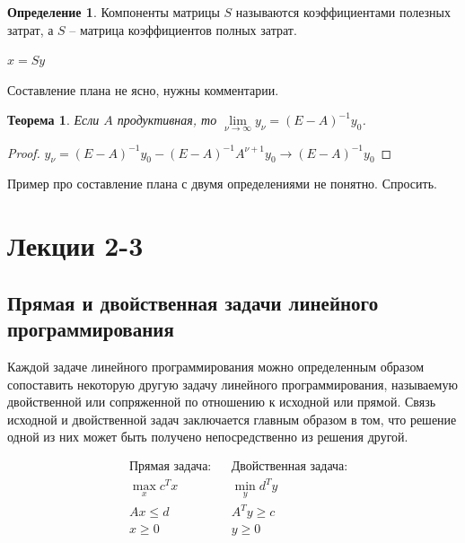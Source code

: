 \documentclass[12pt,a4paper,titlepage,oneside]{book}
\theoremstyle{definition}
\newtheorem{definition}{Определение}[chapter]
\theoremstyle{plain}
\newtheorem{theorem}{Теорема}[chapter]
\theoremstyle{remark}
\theoremstyle{remark}
\theoremstyle{plain}
\theoremstyle{plain}
\begin{document}
\begin{definition}
Компоненты матрицы $S$ называются коэффициентами полезных затрат, а $S$ -- матрица коэффициентов полных затрат.

$x = Sy$

\end{definition}


Составление плана не ясно, нужны комментарии.

\begin{theorem}
Если $A$ продуктивная, то $\lim\limits_{\nu \to \infty} y_{\nu} = (E-A)^{-1}y_0$.
\end{theorem}

\begin{proof}
$y_{\nu} = (E-A)^{-1}y_0 - (E-A)^{-1}A^{\nu+1}y_0 \to (E-A)^{-1}y_0$
\end{proof}

Пример про составление плана с двумя определениями не понятно. Спросить.

\chapter{Лекции 2-3}
\section{Прямая и двойственная задачи линейного программирования}
Каждой задаче линейного программирования можно определенным образом сопоставить некоторую другую задачу линейного программирования, называемую двойственной или сопряженной по отношению к исходной или прямой. Связь исходной и двойственной задач заключается главным образом в том, что решение одной из них может быть получено непосредственно из решения другой. 

\begin{align*}
&\text{Прямая задача:}  &&\text{Двойственная задача:}\\
&\max\limits_x c^Tx \qquad && \min\limits_y d^Ty \\
&Ax \leq d \qquad && A^Ty \geq c\\
&x \geq 0 \qquad && y \geq 0
\end{align*}
\end{document}
